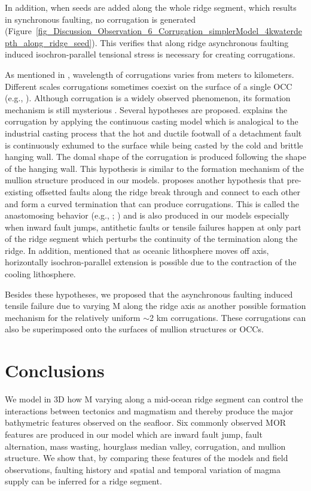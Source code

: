 \documentclass[draft,gc]{agutex}
\begin{document}
\begin{article}
In addition, when seeds are added along the whole ridge segment, which results in synchronous faulting, no corrugation is generated (Figure~\ref{fig_Discussion_Observation_6_Corrugation_simplerModel_4kwaterdepth_along_ridge_seed}). This verifies that along ridge asynchronous faulting induced isochron-parallel tensional stress is necessary for creating corrugations.

As mentioned in \citet{Smith2014}, wavelength of corrugations varies from meters to kilometers. Different scales corrugations sometimes coexist on the surface of a single OCC (e.g., \citealp{MacLeod2009}). Although corrugation is a widely observed phenomenon, its formation mechanism is still mysterious \citep{Smith2006}. Several hypotheses are proposed. \citet{Spencer1999} explains the corrugation by applying the continuous casting model which is analogical to the industrial casting process that the hot and ductile footwall of a detachment fault is continuously exhumed to the surface while being casted by the cold and brittle hanging wall. The domal shape of the corrugation is produced following the shape of the hanging wall. This hypothesis is similar to the formation mechanism of the mullion structure produced in our models. \citet{Smith2014} proposes another hypothesis that pre-existing offsetted faults along the ridge break through and connect to each other and form a curved termination that can produce corrugations. This is called the anastomosing behavior (e.g., \citealp{Ferrill1999}; \citealp{Wong2008}) and is also produced in our models especially when inward fault jumps, antithetic faults or tensile failures happen at only part of the ridge segment which perturbs the continuity of the termination along the ridge. In addition, \citet{Tucholke1998} mentioned that as oceanic lithosphere moves off axis, horizontally isochron-parallel extension is possible due to the contraction of the cooling lithosphere.

Besides these hypotheses, we proposed that the asynchronous faulting induced tensile failure due to varying M along the ridge axis as another possible formation mechanism for the relatively uniform $\sim$2 km corrugations. These corrugations can also be superimposed onto the surfaces of mullion structures or OCCs.

\section{Conclusions}
We model in 3D how M varying along a mid-ocean ridge segment can control the interactions between tectonics and magmatism and thereby produce the major bathymetric features observed on the seafloor. Six commonly observed MOR features are produced in our model which are inward fault jump, fault alternation, mass wasting, hourglass median valley, corrugation, and mullion structure. We show that, by comparing these features of the models and field observations, faulting history and spatial and temporal variation of magma supply can be inferred for a ridge segment.


\end{article}
\end{document}

